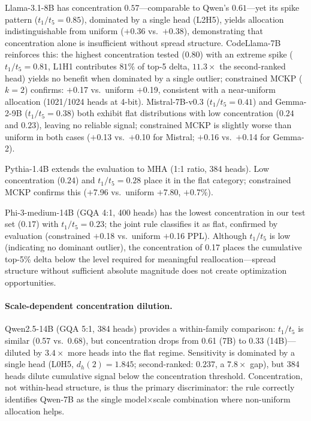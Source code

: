 Llama-3.1-8B has concentration $0.57$---comparable to Qwen's $0.61$---yet its spike pattern ($t_1/t_5{=}0.85$), dominated by a single head (L2H5), yields allocation indistinguishable from uniform ($+$0.36 vs.\ $+$0.38), demonstrating that concentration alone is insufficient without spread structure. %
CodeLlama-7B reinforces this: the highest concentration tested ($0.80$) with an extreme spike ($t_1/t_5{=}0.81$, L1H1 contributes $81\%$ of top-5 delta, $11.3\times$ the second-ranked head) yields no benefit when dominated by a single outlier; constrained MCKP ($k{=}2$) confirms: $+$0.17 vs.\ uniform $+$0.19, consistent with a near-uniform allocation (1021/1024 heads at 4-bit). %
Mistral-7B-v0.3 ($t_1/t_5{=}0.41$) and Gemma-2-9B ($t_1/t_5{=}0.38$) both exhibit flat distributions with low concentration ($0.24$ and $0.23$), leaving no reliable signal; constrained MCKP is slightly worse than uniform in both cases ($+$0.13 vs.\ $+$0.10 for Mistral; $+$0.16 vs.\ $+$0.14 for Gemma-2). %

Pythia-1.4B extends the evaluation to MHA (1:1 ratio, 384 heads).
Low concentration ($0.24$) and $t_1/t_5{=}0.28$ place it in the flat category; constrained MCKP confirms this ($+$7.96 vs.\ uniform $+$7.80, $+$0.7\%). %

Phi-3-medium-14B (GQA 4:1, 400 heads) has the lowest concentration in our test set ($0.17$) with $t_1/t_5{=}0.23$; the joint rule classifies it as flat, confirmed by evaluation (constrained $+$0.18 vs.\ uniform $+$0.16 PPL).
Although $t_1/t_5$ is low (indicating no dominant outlier), the concentration of 0.17 places the cumulative top-5\% delta below the level required for meaningful reallocation---spread structure without sufficient absolute magnitude does not create optimization opportunities. %

\paragraph{Scale-dependent concentration dilution.}
Qwen2.5-14B (GQA 5:1, 384 heads) provides a within-family comparison: $t_1/t_5$ is similar (0.57 vs.\ 0.68), but concentration drops from 0.61 (7B) to 0.33 (14B)---diluted by $3.4\times$ more heads into the flat regime.
Sensitivity is dominated by a single head (L0H5, $d_h(2){=}1.845$; second-ranked: $0.237$, a $7.8\times$ gap), but 384 heads dilute cumulative signal below the concentration threshold.
Concentration, not within-head structure, is thus the primary discriminator: the rule correctly identifies Qwen-7B as the single model$\times$scale combination where non-uniform allocation helps.

